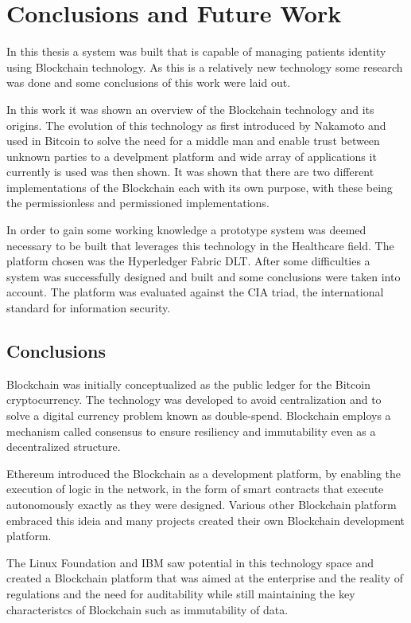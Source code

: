 \chapter{Conclusions and Future Work}\label{Conclusion}

In this thesis a system was built that is capable of managing patients identity
using Blockchain technology. As this is a relatively new technology some
research was done and some conclusions of this work were laid out. 

In this work it was shown an overview of the Blockchain technology and its
origins. The evolution of this technology as first introduced by Nakamoto and
used in Bitcoin to solve the need for a middle man and enable trust between
unknown parties to a develpment platform and wide array of applications it
currently is used was then shown. It was shown that there are two different
implementations of the Blockchain each with its own purpose, with these being
the permissionless and permissioned implementations.

In order to gain some working knowledge a prototype system was deemed necessary
to be built that leverages this technology in the Healthcare field. The
platform chosen was the Hyperledger Fabric DLT. After some difficulties a
system was successfully designed and built and some conclusions were taken into
account. The platform was evaluated against the CIA triad, the international
standard for information security.

\section{Conclusions}

Blockchain was initially conceptualized as the public ledger for the Bitcoin
cryptocurrency. The technology was developed to avoid centralization and to
solve a digital currency problem known as double-spend. Blockchain employs a
mechanism called consensus to ensure resiliency and immutability even as a
decentralized structure.

Ethereum introduced the Blockchain as a development platform, by enabling the
execution of logic in the network, in the form of smart contracts that execute
autonomously exactly as they were designed. Various other Blockchain platform
embraced this ideia and many projects created their own Blockchain development
platform.

The Linux Foundation and IBM saw potential in this technology space and created
a Blockchain platform that was aimed at the enterprise and the reality of
regulations and the need for auditability while still maintaining the key
characteristcs of Blockchain such as immutability of data.


